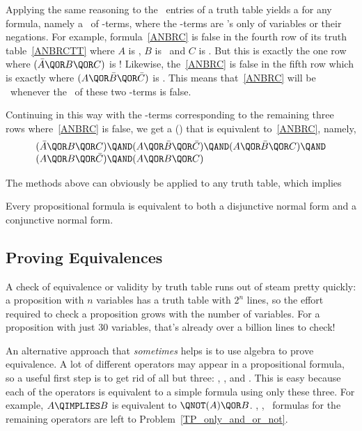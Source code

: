 Applying the same reasoning to the \false\ entries of a truth table
yields a  for any formula, namely a \QAND\
of \QOR-terms, where the \QOR-terms are \QOR's only of variables or
their negations.  For example, formula~\eqref{ANBRC} is false in the
fourth row of its truth table~\eqref{ANBRCTT} where $A$ is \true, $B$
is \false\ and $C$ is \false.  But this is exactly the one row where
$(\bar{A} \QOR B \QOR C)$ is \false!  Likewise, the~\eqref{ANBRC} is
false in the fifth row which is exactly where
$(A \QOR \bar{B} \QOR \bar{C})$ is \false.  This means
that~\eqref{ANBRC} will be \false\ whenever the \QAND\ of these
two \QOR-terms is false.  
\iffalse
$(\bar{A} \QOR B \QOR C) \QAND (A \QOR \bar{B} \QOR \bar{C})$ is \false.
\fi
Continuing in this way with the \QOR-terms corresponding to the
remaining three rows where~\eqref{ANBRC} is false, we get a
 () that is equivalent to~\eqref{ANBRC}, namely,
\[\begin{array}{l}
(\bar{A} \QOR B \QOR C)  \QAND (A \QOR \bar{B} \QOR \bar{C}) 
        \QAND (A \QOR \bar{B} \QOR C)  \QAND \\
(A \QOR B \QOR \bar{C}) \QAND (A \QOR B \QOR C)
\end{array}\]

The methods above can obviously be applied to any truth table, which implies
\begin{theorem}
Every propositional formula is equivalent to both a disjunctive normal
form and a conjunctive normal form.
\end{theorem}

\subsection{Proving Equivalences}\label{propositional_equivalences_sec}
A check of equivalence or validity by truth table runs out of steam
pretty quickly: a proposition with $n$ variables has a truth table
with $2^n$ lines, so the effort required to check a proposition
grows  with the number of variables.  For a
proposition with just 30 variables, that's already over a billion
lines to check!

An alternative approach that \emph{sometimes} helps is to use algebra
to prove equivalence.  A lot of different operators may appear in a
propositional formula, so a useful first step is to get rid of all but
three: \QAND, \QOR, and \QNOT.  This is easy because each of the
operators is equivalent to a simple formula using only these three.
For example, $A \QIMPLIES B$ is equivalent to $\QNOT(A) \QOR
B$.  \QAND, \QOR, \QNOT\ formulas for the remaining operators are left
to Problem~\ref{TP_only_and_or_not}.


